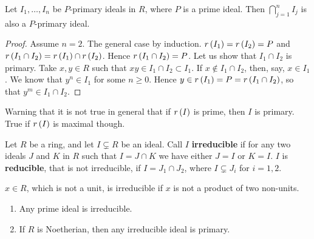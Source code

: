 \begin{lemma}
\label{lem:11.4}
Let $ I_1, \dots, I_n $ be $ P $-primary ideals in $ R $, where $ P $ is a prime ideal. Then $ \bigcap_{j = 1}^n I_j $ is also a $ P $-primary ideal.
\end{lemma}

\begin{proof}
Assume $ n = 2 $. The general case by induction. $ r\left( I_1 \right) = r\left( I_2 \right) = P $ and $ r\left( I_1 \cap I_2 \right) = r\left( I_1 \right) \cap r\left( I_2 \right) $. Hence $ r\left( I_1 \cap I_2 \right) = P $. Let us show that $ I_1 \cap I_2 $ is primary. Take $ x, y \in R $ such that $ xy \in I_1 \cap I_2 \subset I_1 $. If $ x \notin I_1 \cap I_2 $, then, say, $ x \in I_1 $. We know that $ y^n \in I_1 $ for some $ n \ge 0 $. Hence $ y \in r\left( I_1 \right) = P = r\left( I_1 \cap I_2 \right) $, so that $ y^m \in I_1 \cap I_2 $.
\end{proof}

Warning that it is not true in general that if $ r\left( I \right) $ is prime, then $ I $ is primary. True if $ r\left( I \right) $ is maximal though.

\pagebreak


\begin{definition}
Let $ R $ be a ring, and let $ I \subsetneq R $ be an ideal. Call $ I $ \textbf{irreducible} if for any two ideals $ J $ and $ K $ in $ R $ such that $ I = J \cap K $ we have either $ J = I $ or $ K = I $. $ I $ is \textbf{reducible}, that is not irreducible, if $ I = J_1 \cap J_2 $, where $ I \subsetneq J_i $ for $ i = 1, 2 $.
\end{definition}

\begin{note*}
$ x \in R $, which is not a unit, is irreducible if $ x $ is not a product of two non-units.
\end{note*}

\begin{proposition}
\label{prop:11.5}
\hfill
\begin{enumerate}
\item Any prime ideal is irreducible.
\item If $ R $ is Noetherian, then any irreducible ideal is primary.
\end{enumerate}
\end{proposition}

